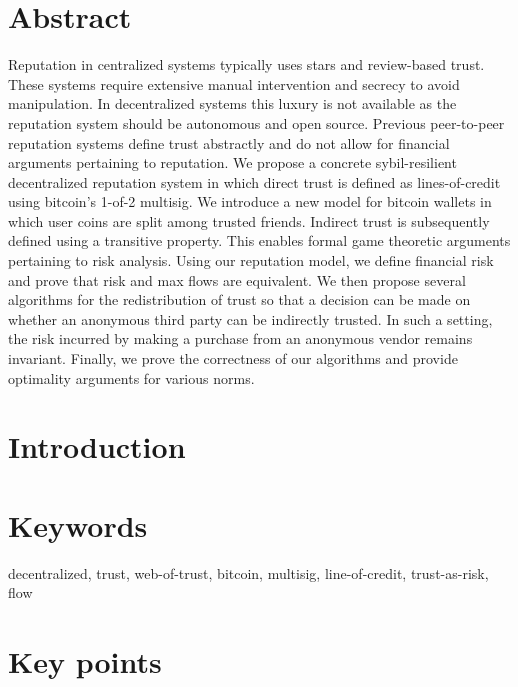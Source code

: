 \documentclass[11pt]{article}
\theoremstyle{definition}
\theoremstyle{corollary}
\begin{document}
  \section{Abstract}
  Reputation in centralized systems typically uses stars and review-based
  trust. These systems require extensive manual intervention and secrecy to
  avoid manipulation. In decentralized systems this luxury is not available
  as the reputation system should be autonomous and open source. Previous
  peer-to-peer reputation systems define trust abstractly and do not allow for
  financial arguments pertaining to reputation. We propose a concrete
  sybil-resilient decentralized reputation system in which direct trust is
  defined as lines-of-credit using bitcoin's 1-of-2 multisig. We introduce a new
  model for bitcoin wallets in which user coins are split among trusted friends.
  Indirect trust is subsequently defined using a transitive property. This
  enables formal game theoretic arguments pertaining to risk analysis. Using our
  reputation model, we define financial risk and prove that risk and max flows
  are equivalent. We then propose several algorithms for the redistribution of
  trust so that a decision can be made on whether an anonymous third party can
  be indirectly trusted. In such a setting, the risk incurred by making a
  purchase from an anonymous vendor remains invariant. Finally, we prove the
  correctness of our algorithms and provide optimality arguments for various
  norms.

  \section{Introduction}

  \section{Keywords}
      decentralized, trust, web-of-trust, bitcoin, multisig, line-of-credit, trust-as-risk, flow  

  \section{Key points}
\end{document}
